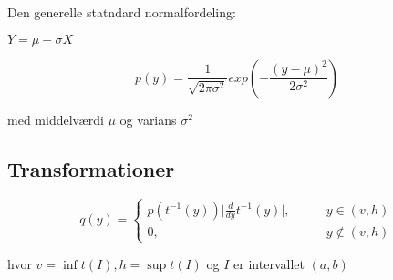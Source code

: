 Den generelle statndard normalfordeling:

$Y = \mu + \sigma X$

\begin{equation}
    p(y) = \frac{1}{\sqrt{2\pi \sigma^2}}exp\left( - \frac{(y-\mu)^2}{2\sigma^2}\right)
\end{equation}

med middelværdi $\mu$ og varians $\sigma^2$

\subsection{Transformationer}

\begin{equation}
    q(y) = 
    \begin{cases}
        p(t^{-1}(y)) \lvert \frac{d}{dy} t^{-1}(y) \rvert , \qquad &y \in (v,h) \\
        0, \qquad &y \notin (v,h)
    \end{cases}
\end{equation}

hvor $v = \inf t(I), h = \sup t(I)$ og $I$ er intervallet $(a,b)$
